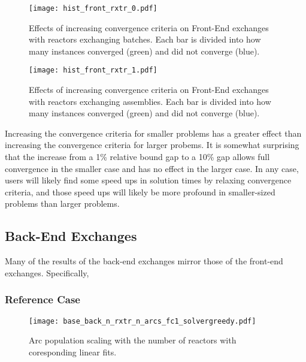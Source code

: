 \begin{figure}[h!]
  \begin{center}
    \texttt{[image: hist\_front\_rxtr\_0.pdf]}
    \caption[]{
      \label{fig:hist_front_rxtr_0}
      Effects of increasing convergence criteria on Front-End exchanges with
      reactors exchanging batches. Each bar is divided into how many instances
      converged (green) and did not converge (blue). }
  \end{center}
\end{figure}

\begin{figure}[h!]
  \begin{center}
    \texttt{[image: hist\_front\_rxtr\_1.pdf]}
    \caption[]{
      \label{fig:hist_front_rxtr_1}
      Effects of increasing convergence criteria on Front-End exchanges with
      reactors exchanging assemblies. Each bar is divided into how many instances
      converged (green) and did not converge (blue).}
  \end{center}
\end{figure}

Increasing the convergence criteria for smaller problems has a greater effect
than increasing the convergence criteria for larger probems. It is somewhat
surprising that the increase from a 1\% relative bound gap to a 10\% gap allows
full convergence in the smaller case and has no effect in the larger case. In
any case, users will likely find some speed ups in solution times by relaxing
convergence criteria, and those speed ups will likely be more profound in
smaller-sized problems than larger problems.

\subsection{Back-End Exchanges}

Many of the results of the back-end exchanges mirror those of the front-end
exchanges. Specifically, 

\subsubsection{Reference Case}



\begin{figure}[h!]
  \begin{center}
    \texttt{[image: base\_back\_n\_rxtr\_n\_arcs\_fc1\_solvergreedy.pdf]}
    \caption[]{
      \label{fig:base_back_n_rxtr_n_arcs_fc1_solvergreedy}
      Arc population scaling with the number of reactors with coresponding linear fits.}
  \end{center}
\end{figure}

